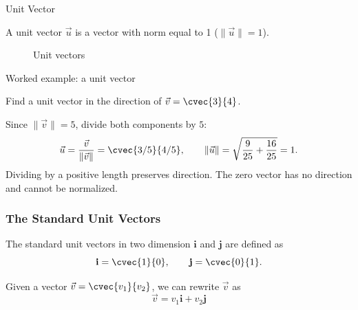 \begin{frame}{Unit Vector}
\begin{defn}{}{}
A unit vector $\vec{u}$ is a vector with norm equal to 1 ($\| \vec{u} \| = 1$).
\end{defn}
\begin{figure}[h!]
\centering
{}
\caption{Unit vectors }
\end{figure}
\end{frame}
\begin{frame}[t]{Worked example: a unit vector}
\begin{ex}
Find a unit vector in the direction of $\vec{v}=\cvec{3}{4}$.
\end{ex}
\begin{sol}
Since $\|\vec{v}\|=5$, divide both components by $5$:
\[
\vec{u}=\frac{\vec{v}}{\|\vec{v}\|}=\cvec{3/5}{4/5},
\qquad \|\vec{u}\|=\sqrt{\frac{9}{25}+\frac{16}{25}}=1.
\]
Dividing by a positive length preserves direction. The zero vector has no direction and cannot be normalized.
\end{sol}
\end{frame}



\begin{frame}
\frametitle{The Standard Unit Vectors}
\begin{defn}{}{}
The standard unit vectors in two dimension $\textbf{i}$ and $\textbf{j}$ are defined as
\[ \textbf{i} = \cvec{1}{0}, \qquad \textbf{j} = \cvec{0}{1}.\]

\tcblower
Given a vector $\vec{v} = \cvec{v_1}{v_2}$, we can rewrite $\vec{v}$ as 
\[ \vec{v} = v_1 \textbf{i} + v_2 \textbf{j}\]
\end{defn}
\end{frame}

